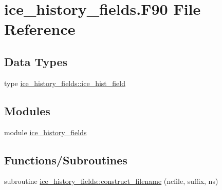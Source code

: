 \hypertarget{ice__history__fields_8F90}{
\section{ice\_\-history\_\-fields.F90 File Reference}
\label{ice__history__fields_8F90}
}
\subsection*{Data Types}
\begin{DoxyCompactItemize}
\item 
type \hyperlink{typeice__history__fields_1_1ice__hist__field}{ice\_\-history\_\-fields::ice\_\-hist\_\-field}
\end{DoxyCompactItemize}
\subsection*{Modules}
\begin{DoxyCompactItemize}
\item 
module \hyperlink{namespaceice__history__fields}{ice\_\-history\_\-fields}
\end{DoxyCompactItemize}
\subsection*{Functions/Subroutines}
\begin{DoxyCompactItemize}
\item 
subroutine \hyperlink{namespaceice__history__fields_a64420e9d3c2971300dd20fc51259f7e8}{ice\_\-history\_\-fields::construct\_\-filename} (ncfile, suffix, ns)
\end{DoxyCompactItemize}
